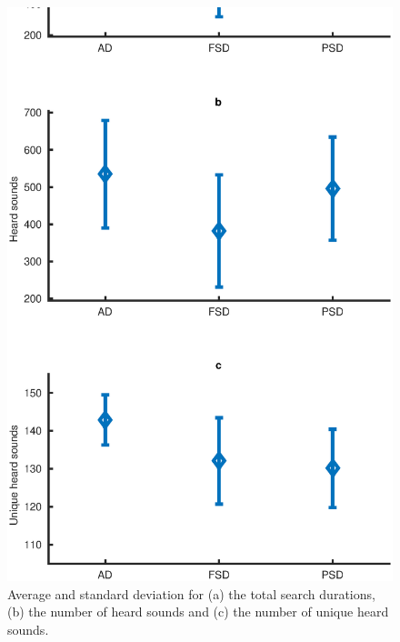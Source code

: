 \documentclass{aes2e}
\begin{document}
\begin{figure}[t]
\begin{center}
\includegraphics[scale=0.4]{gfx/analyse_urban1.eps} 
\end{center}
\caption{\label{fig1} Average and standard deviation for (a) the total search durations, (b) the number of heard sounds and (c) the number of unique heard sounds.}
\end{figure}  
\end{document}
